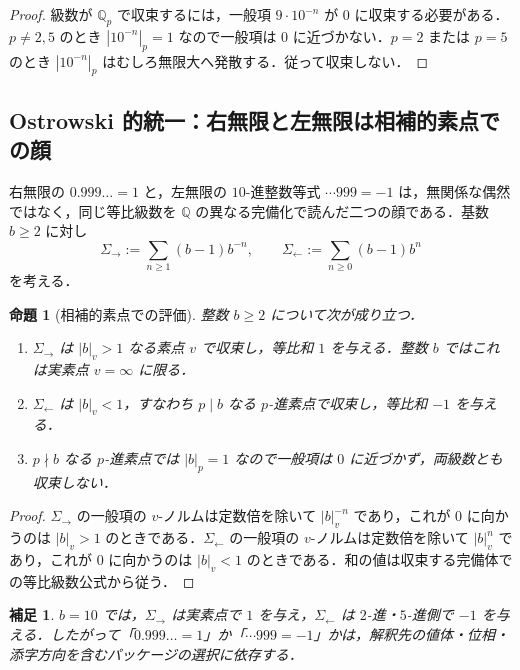\documentclass[a4paper,11pt]{ltjsarticle}
\theoremstyle{jpdef}
\newtheorem{remark}[definition]{補足}
\theoremstyle{jpthm}
\newtheorem{proposition}[definition]{命題}
\newcommand{\Q}{\mathbb{Q}}
\begin{document}
\begin{proof}
級数が \(\Q_p\) で収束するには，一般項 \(9\cdot10^{-n}\) が \(0\) に収束する必要がある．\(p\ne2,5\) のとき \(|10^{-n}|_p=1\) なので一般項は \(0\) に近づかない．\(p=2\) または \(p=5\) のとき \(|10^{-n}|_p\) はむしろ無限大へ発散する．従って収束しない．
\end{proof}

\subsection{Ostrowski 的統一：右無限と左無限は相補的素点での顔}

右無限の \(0.999\ldots=1\) と，左無限の \(10\)-進整数等式 \(\cdots999=-1\) は，無関係な偶然ではなく，同じ等比級数を \(\Q\) の異なる完備化で読んだ二つの顔である．基数 \(b\ge2\) に対し
\[
  \Sigma_{\to}:=\sum_{n\ge1}(b-1)b^{-n},
  \qquad
  \Sigma_{\leftarrow}:=\sum_{n\ge0}(b-1)b^n
\]
を考える．

\begin{proposition}[相補的素点での評価]
整数 \(b\ge2\) について次が成り立つ．
\begin{enumerate}
\item \(\Sigma_{\to}\) は \(|b|_v>1\) なる素点 \(v\) で収束し，等比和 \(1\) を与える．整数 \(b\) ではこれは実素点 \(v=\infty\) に限る．
\item \(\Sigma_{\leftarrow}\) は \(|b|_v<1\)，すなわち \(p\mid b\) なる \(p\)-進素点で収束し，等比和 \(-1\) を与える．
\item \(p\nmid b\) なる \(p\)-進素点では \(|b|_p=1\) なので一般項は \(0\) に近づかず，両級数とも収束しない．
\end{enumerate}
\end{proposition}

\begin{proof}
\(\Sigma_{\to}\) の一般項の \(v\)-ノルムは定数倍を除いて \(|b|_v^{-n}\) であり，これが \(0\) に向かうのは \(|b|_v>1\) のときである．\(\Sigma_{\leftarrow}\) の一般項の \(v\)-ノルムは定数倍を除いて \(|b|_v^n\) であり，これが \(0\) に向かうのは \(|b|_v<1\) のときである．和の値は収束する完備体での等比級数公式から従う．
\end{proof}

\begin{remark}
\(b=10\) では，\(\Sigma_{\to}\) は実素点で \(1\) を与え，\(\Sigma_{\leftarrow}\) は \(2\)-進・\(5\)-進側で \(-1\) を与える．したがって「\(0.999\ldots=1\)」か「\(\cdots999=-1\)」かは，解釈先の値体・位相・添字方向を含むパッケージの選択に依存する．
\end{remark}
\end{document}
